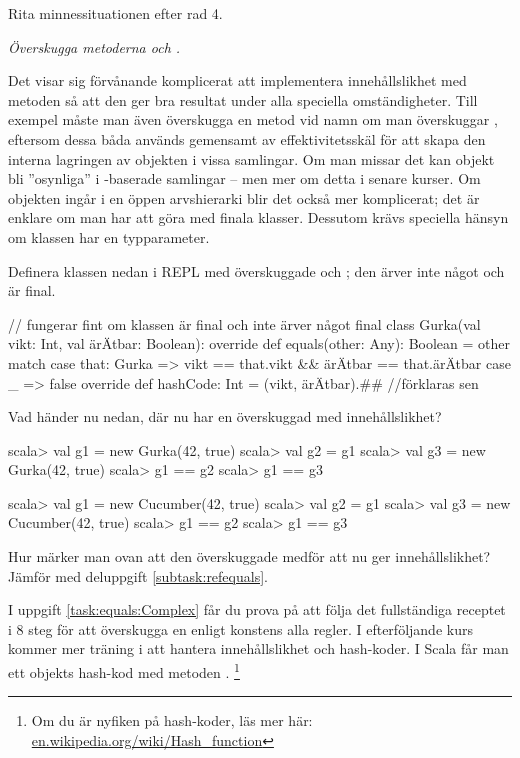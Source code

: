 \Subtask Rita minnessituationen efter rad 4.

\Subtask \emph{Överskugga metoderna  och .}

\begin{Background}
Det visar sig förvånande komplicerat att implementera innehållslikhet med metoden  så att den ger bra resultat under alla speciella omständigheter. Till exempel måste man även överskugga en metod vid namn  om man överskuggar , eftersom dessa båda används gemensamt av effektivitetsskäl för att skapa den interna lagringen av objekten i vissa samlingar. Om man missar det kan objekt bli ''osynliga'' i -baserade samlingar -- men mer om detta i senare kurser. Om objekten ingår i en öppen arvshierarki blir det också mer komplicerat; det är enklare om man har att göra med finala klasser. Dessutom krävs speciella hänsyn om klassen har en typparameter.
\end{Background}

\noindent Definera klassen nedan i REPL med överskuggade  och ; den ärver inte något och är final.

\begin{Code}
// fungerar fint om klassen är final och inte ärver något
final class Gurka(val vikt: Int, val ärÄtbar: Boolean):
  override def equals(other: Any): Boolean = other match
    case that: Gurka => vikt == that.vikt && ärÄtbar == that.ärÄtbar
    case _ => false
  override def hashCode: Int = (vikt, ärÄtbar).## //förklaras sen
\end{Code}
\Subtask Vad händer nu nedan, där \ifswedish{}\else{}\fi{} nu har en överskuggad  med innehållslikhet?
\ifswedish
\begin{REPL}
scala> val g1 = new Gurka(42, true)
scala> val g2 = g1
scala> val g3 = new Gurka(42, true)
scala> g1 == g2
scala> g1 == g3
\end{REPL}
\else
\begin{REPL}
scala> val g1 = new Cucumber(42, true)
scala> val g2 = g1
scala> val g3 = new Cucumber(42, true)
scala> g1 == g2
scala> g1 == g3
\end{REPL}
\fi
\Subtask Hur märker man ovan att den överskuggade  medför att \code{==} nu ger innehållslikhet? Jämför med deluppgift \ref{subtask:refequals}.

I uppgift \ref{task:equals:Complex} får du prova på att följa det fullständiga receptet i 8 steg för att överskugga en  enligt konstens alla regler. I efterföljande kurs kommer mer träning i att hantera innehållslikhet och hash-koder. I Scala får man ett objekts hash-kod med metoden \code{##}.%
\footnote{Om du är nyfiken på hash-koder, läs mer här:
\href{https://en.wikipedia.org/wiki/Hash_function}
{en.wikipedia.org/wiki/Hash\_function}
}


